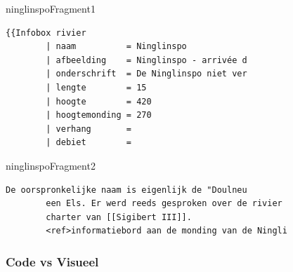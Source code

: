 \documentclass[../presentatie.tex]{subfiles}
\begin{document}
\begin{saveblock}{ninglinspoFragment1}
    \begin{Verbatim}[tabsize=4,gobble=8]
        {{Infobox rivier
        | naam          = Ninglinspo
        | afbeelding    = Ninglinspo - arrivée d
        | onderschrift  = De Ninglinspo niet ver
        | lengte        = 15
        | hoogte        = 420
        | hoogtemonding = 270
        | verhang       =
        | debiet        =
    \end{Verbatim}
\end{saveblock}

\begin{saveblock}{ninglinspoFragment2}
    \begin{Verbatim}[tabsize=4,gobble=8]
        De oorspronkelijke naam is eigenlijk de "Doulneu
        een Els. Er werd reeds gesproken over de rivier
        charter van [[Sigibert III]].
        <ref>informatiebord aan de monding van de Ningli
    \end{Verbatim}
\end{saveblock}

\begin{frame}
    \frametitle{Code vs Visueel}

    \vspace{5pt}

\end{frame}
\end{document}
